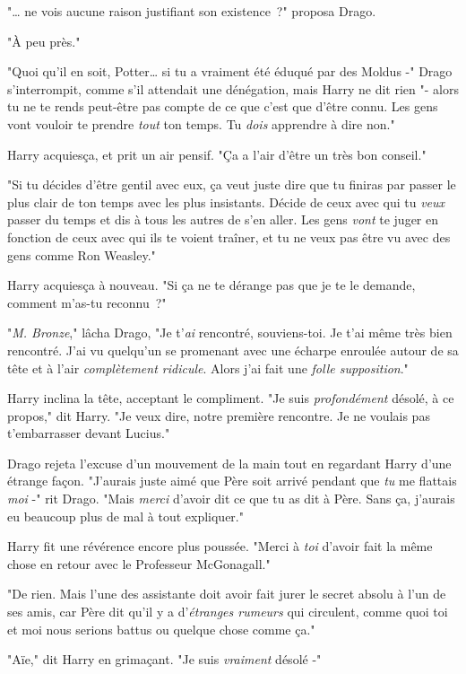 "… ne vois aucune raison justifiant son existence~?" proposa Drago.

"À peu près."

"Quoi qu'il en soit, Potter… si tu a vraiment été éduqué par des Moldus -" Drago s'interrompit, comme s'il attendait une dénégation, mais Harry ne dit rien "- alors tu ne te rends peut-être pas compte de ce que c'est que d'être connu. Les gens vont vouloir te prendre \emph{tout} ton temps. Tu \emph{dois} apprendre à dire non."

Harry acquiesça, et prit un air pensif. "Ça a l'air d'être un très bon conseil."

"Si tu décides d'être gentil avec eux, ça veut juste dire que tu finiras par passer le plus clair de ton temps avec les plus insistants. Décide de ceux avec qui tu \emph{veux} passer du temps et dis à tous les autres de s'en aller. Les gens \emph{vont} te juger en fonction de ceux avec qui ils te voient traîner, et tu ne veux pas être vu avec des gens comme Ron Weasley."

Harry acquiesça à nouveau. "Si ça ne te dérange pas que je te le demande, comment m'as-tu reconnu~?"

"\emph{M. Bronze}," lâcha Drago, "Je t'\emph{ai} rencontré, souviens-toi. Je t'ai même très bien rencontré. J'ai vu quelqu'un se promenant avec une écharpe enroulée autour de sa tête et à l'air \emph{complètement ridicule}. Alors j'ai fait une \emph{folle supposition}."

Harry inclina la tête, acceptant le compliment. "Je suis \emph{profondément} désolé, à ce propos," dit Harry. "Je veux dire, notre première rencontre. Je ne voulais pas t'embarrasser devant Lucius."

Drago rejeta l'excuse d'un mouvement de la main tout en regardant Harry d'une étrange façon. "J'aurais juste aimé que Père soit arrivé pendant que \emph{tu} me flattais \emph{moi} -" rit Drago. "Mais \emph{merci} d'avoir dit ce que tu as dit à Père. Sans ça, j'aurais eu beaucoup plus de mal à tout expliquer."

Harry fit une révérence encore plus poussée. "Merci à \emph{toi} d'avoir fait la même chose en retour avec le Professeur McGonagall."

"De rien. Mais l'une des assistante doit avoir fait jurer le secret absolu à l'un de ses amis, car Père dit qu'il y a d'\emph{étranges rumeurs} qui circulent, comme quoi toi et moi nous serions battus ou quelque chose comme ça."

"Aïe," dit Harry en grimaçant. "Je suis \emph{vraiment} désolé -"

